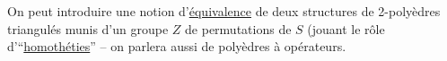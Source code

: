 On peut introduire une notion d'\uline{équivalence} de deux structures de 2-polyèdres  triangulés  munis d'un groupe $Z$  de permutations de $S$ (jouant le rôle d'``\uline{homothéties}'' -- on parlera aussi de  polyèdres à opérateurs.
